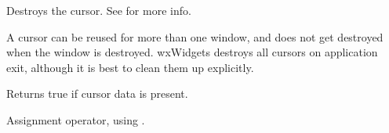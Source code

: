 \label{wxcursordtor}


Destroys the cursor.
See  for more info.

A cursor can be reused for more
than one window, and does not get destroyed when the window is
destroyed. wxWidgets destroys all cursors on application exit, although
it is best to clean them up explicitly.

\label{wxcursorisok}


Returns true if cursor data is present.

\label{wxcursorassignment}


Assignment operator, using .

